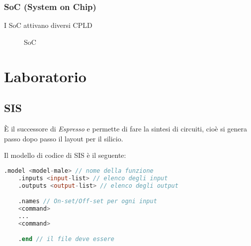 \documentclass[a4paper]{article}
\theoremstyle{break}
\theoremstyle{break}
\theoremstyle{break}
\theoremstyle{break}
\begin{document}
\subsubsection{SoC (System on Chip)}
I SoC attivano diversi CPLD
\begin{figure}[H]
   \begin{center}
   \end{center} 
   \caption{SoC}
\end{figure}

\section{Laboratorio}
\subsection{SIS}
È il successore di \emph{Espresso} e permette di fare la sintesi di circuiti, cioè
si genera passo dopo passo il layout per il silicio.

Il modello di codice di SIS è il seguente:
\begin{lstlisting}[language=Verilog]
    .model <model-male> // nome della funzione
    .inputs <input-list> // elenco degli input
    .outputs <output-list> // elenco degli output

    .names // On-set/Off-set per ogni input
    <command> 
    ...
    <command>

    .end // il file deve essere 
\end{lstlisting}
\end{document}
